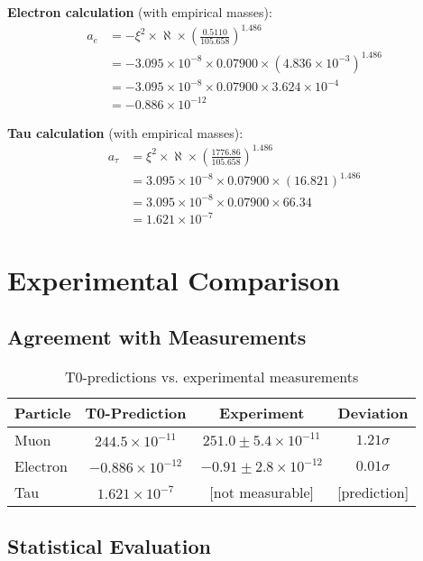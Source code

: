\documentclass[12pt,a4paper]{article}
\newcommand{\xipar}{\xi}
\newcommand{\sigmadev}{\sigma}
\begin{document}
	\textbf{Electron calculation} (with empirical masses):
	\begin{align}
		a_e &= -\xipar^2 \times \aleph \times \left(\frac{0.5110}{105.658}\right)^{1.486} \\
		&= -3.095 \times 10^{-8} \times 0.07900 \times (4.836 \times 10^{-3})^{1.486} \\
		&= -3.095 \times 10^{-8} \times 0.07900 \times 3.624 \times 10^{-4} \\
		&= -0.886 \times 10^{-12}
	\end{align}
	
	\textbf{Tau calculation} (with empirical masses):
	\begin{align}
		a_\tau &= \xipar^2 \times \aleph \times \left(\frac{1776.86}{105.658}\right)^{1.486} \\
		&= 3.095 \times 10^{-8} \times 0.07900 \times (16.821)^{1.486} \\
		&= 3.095 \times 10^{-8} \times 0.07900 \times 66.34 \\
		&= 1.621 \times 10^{-7}
	\end{align}
	
	\section{Experimental Comparison}
	
	\subsection{Agreement with Measurements}
	
	\begin{table}[H]
		\centering
		\begin{tabular}{lccc}
			\toprule
			\textbf{Particle} & \textbf{T0-Prediction} & \textbf{Experiment} & \textbf{Deviation} \\
			\midrule
			Muon & $244.5 \times 10^{-11}$ & $251.0 \pm 5.4 \times 10^{-11}$ & $1.21\sigmadev$ \\
			Electron & $-0.886 \times 10^{-12}$ & $-0.91 \pm 2.8 \times 10^{-12}$ & $0.01\sigmadev$ \\
			Tau & $1.621 \times 10^{-7}$ & [not measurable] & [prediction] \\
			\bottomrule
		\end{tabular}
		\caption{T0-predictions vs. experimental measurements}
	\end{table}
	
	\subsection{Statistical Evaluation}
	
\end{document}
